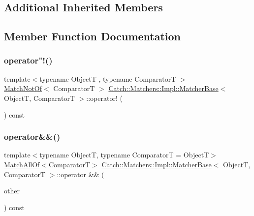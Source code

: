 \subsection*{Additional Inherited Members}


\subsection{Member Function Documentation}
\mbox{\label{struct_catch_1_1_matchers_1_1_impl_1_1_matcher_base_a85174b5b27113f7bdc47c140c1c72602}} 
\subsubsection{\texorpdfstring{operator"!()}{operator!()}}
{\footnotesize\ttfamily template$<$typename ObjectT , typename ComparatorT $>$ \\
\mbox{\hyperlink{struct_catch_1_1_matchers_1_1_impl_1_1_match_not_of}{Match\+Not\+Of}}$<$ ComparatorT $>$ \mbox{\hyperlink{struct_catch_1_1_matchers_1_1_impl_1_1_matcher_base}{Catch\+::\+Matchers\+::\+Impl\+::\+Matcher\+Base}}$<$ ObjectT, ComparatorT $>$\+::operator! (\begin{DoxyParamCaption}{ }\end{DoxyParamCaption}) const}

\mbox{\label{struct_catch_1_1_matchers_1_1_impl_1_1_matcher_base_a3deede6b29d20c15cb5efc79df40a520}} 
\subsubsection{\texorpdfstring{operator\&\&()}{operator\&\&()}}
{\footnotesize\ttfamily template$<$typename ObjectT, typename ComparatorT = ObjectT$>$ \\
\mbox{\hyperlink{struct_catch_1_1_matchers_1_1_impl_1_1_match_all_of}{Match\+All\+Of}}$<$ComparatorT$>$ \mbox{\hyperlink{struct_catch_1_1_matchers_1_1_impl_1_1_matcher_base}{Catch\+::\+Matchers\+::\+Impl\+::\+Matcher\+Base}}$<$ ObjectT, ComparatorT $>$\+::operator \&\& (\begin{DoxyParamCaption}\item[{\mbox{\hyperlink{struct_catch_1_1_matchers_1_1_impl_1_1_matcher_base}{Matcher\+Base}}$<$ ObjectT, ComparatorT $>$ const \&}]{other }\end{DoxyParamCaption}) const}


